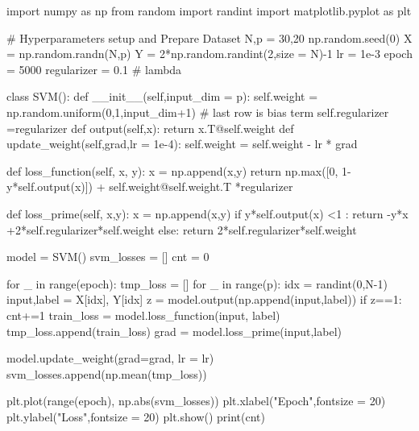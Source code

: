 \documentclass[10pt]{article}
\begin{document}
\begin{python}
import numpy as np
from random import randint
import matplotlib.pyplot as plt

# Hyperparameters setup and Prepare Dataset
N,p = 30,20
np.random.seed(0)
X = np.random.randn(N,p)
Y = 2*np.random.randint(2,size = N)-1
lr = 1e-3
epoch = 5000
regularizer = 0.1 # lambda

class SVM():
    def __init__(self,input_dim = p):
        self.weight = np.random.uniform(0,1,input_dim+1) # last row is bias term
        self.regularizer =regularizer
    def output(self,x):
        return x.T@self.weight
    def update_weight(self,grad,lr = 1e-4):
        self.weight = self.weight - lr * grad

    def loss_function(self, x, y):
        x = np.append(x,y)
        return np.max([0, 1-y*self.output(x)]) + self.weight@self.weight.T *regularizer
    
    def loss_prime(self, x,y):
        x = np.append(x,y)
        if y*self.output(x) <1 : 
            return -y*x +2*self.regularizer*self.weight
        else:
            return 2*self.regularizer*self.weight

model = SVM()
svm_losses = []
cnt = 0

for _ in range(epoch):
    tmp_loss = []
    for _ in range(p):
        idx = randint(0,N-1)
        input,label = X[idx], Y[idx]
        z = model.output(np.append(input,label))
        if z==1:
            cnt+=1
        train_loss = model.loss_function(input, label)
        tmp_loss.append(train_loss)
        grad = model.loss_prime(input,label)
        
        model.update_weight(grad=grad, lr = lr)
    svm_losses.append(np.mean(tmp_loss))

plt.plot(range(epoch), np.abs(svm_losses))
plt.xlabel("Epoch",fontsize = 20)
plt.ylabel("Loss",fontsize = 20)
plt.show()
print(cnt)
\end{python}
\end{document}

